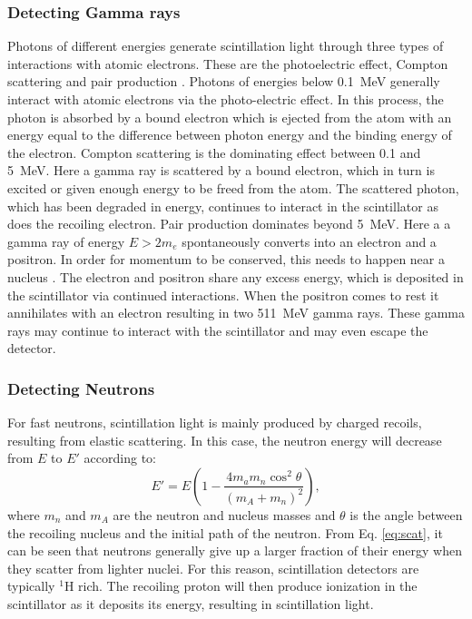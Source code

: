 \documentclass[main.tex]{subfiles}
\begin{document}
\subsubsection{Detecting Gamma rays}
Photons of different energies generate scintillation light through three types of interactions with atomic electrons. These are the photoelectric effect, Compton scattering and pair production \cite{Krane}. 
Photons of energies below \SI{0.1}{\MeV} generally interact with atomic electrons via the photo-electric effect. In this process, the photon is absorbed by a bound electron which is ejected from the atom with an energy equal to the difference between photon energy and the binding energy of the electron. 
Compton scattering is the dominating effect between 0.1 and \SI{5}{\MeV}. Here a gamma ray is scattered by a bound electron, which in turn is excited or given enough energy to be freed from the atom. The scattered photon, which has been degraded in energy, continues to interact in the scintillator as does the recoiling electron.
Pair production dominates beyond \SI{5}{\MeV}.  Here a a gamma ray of energy $E>2m_e$ spontaneously converts into an electron and a positron. In order for momentum to be conserved, this needs to happen near a nucleus \cite{Krane}. The electron and positron share any excess energy, which is deposited in the scintillator via continued interactions. When the positron comes to rest it annihilates with an electron resulting in two \SI{511}{\MeV} gamma rays. These gamma rays may continue to interact with the scintillator and may even escape the detector.


\subsubsection{Detecting Neutrons}
For fast neutrons, scintillation light is mainly produced by charged recoils, resulting from elastic scattering. In this case, the neutron energy will decrease from $E$ to $E'$ according to:
\begin{equation}
	E' = E\left(1 - \frac{4m_a m_n \cos^2{\theta}}{\left(m_A + m_n\right)^2}\right),
	\label{eq:scat}
\end{equation}
where $m_n$ and $m_A$ are the neutron and nucleus masses and $\theta$ is the angle between the recoiling nucleus and the initial path of the neutron. From Eq. \ref{eq:scat}, it can be seen that neutrons generally give up a larger fraction of their energy when they scatter from lighter nuclei. 
For this reason, scintillation detectors are typically $^1$H rich. The recoiling proton will then produce ionization in the scintillator as it deposits its energy, resulting in scintillation light. 
\end{document}
